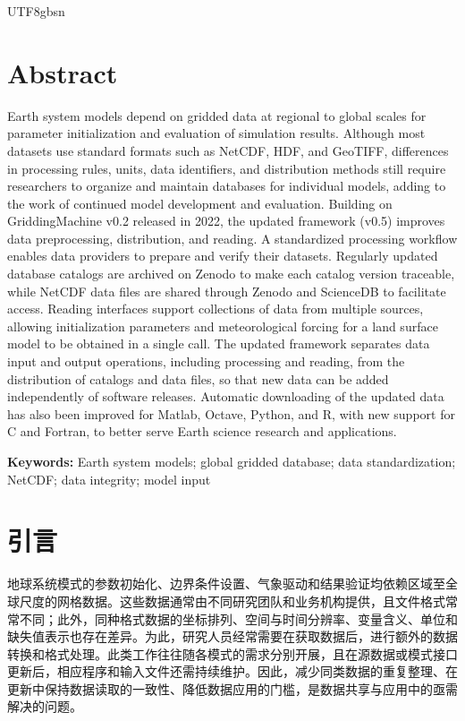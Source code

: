 \documentclass[numdoi]{chinese}
\begin{document}
\begin{CJK}{UTF8}{gbsn}
\section*{Abstract}
Earth system models depend on gridded data at regional to global scales for parameter initialization and evaluation of simulation results. Although most datasets use standard formats such as NetCDF, HDF, and GeoTIFF, differences in processing rules, units, data identifiers, and distribution methods still require researchers to organize and maintain databases for individual models, adding to the work of continued model development and evaluation. Building on GriddingMachine v0.2 released in 2022, the updated framework (v0.5) improves data preprocessing, distribution, and reading. A standardized processing workflow enables data providers to prepare and verify their datasets. Regularly updated database catalogs are archived on Zenodo to make each catalog version traceable, while NetCDF data files are shared through Zenodo and ScienceDB to facilitate access. Reading interfaces support collections of data from multiple sources, allowing initialization parameters and meteorological forcing for a land surface model to be obtained in a single call. The updated framework separates data input and output operations, including processing and reading, from the distribution of catalogs and data files, so that new data can be added independently of software releases. Automatic downloading of the updated data has also been improved for Matlab, Octave, Python, and R, with new support for C and Fortran, to better serve Earth science research and applications.

\textbf{Keywords:} Earth system models; global gridded database; data standardization; NetCDF; data integrity; model input




\clearpage
\section{引言}
地球系统模式的参数初始化、边界条件设置、气象驱动和结果验证均依赖区域至全球尺度的网格数据。这些数据通常由不同研究团队和业务机构提供，且文件格式常常不同；此外，同种格式数据的坐标排列、空间与时间分辨率、变量含义、单位和缺失值表示也存在差异。为此，研究人员经常需要在获取数据后，进行额外的数据转换和格式处理。此类工作往往随各模式的需求分别开展，且在源数据或模式接口更新后，相应程序和输入文件还需持续维护。因此，减少同类数据的重复整理、在更新中保持数据读取的一致性、降低数据应用的门槛，是数据共享与应用中的亟需解决的问题。


\end{CJK}
\end{document}

